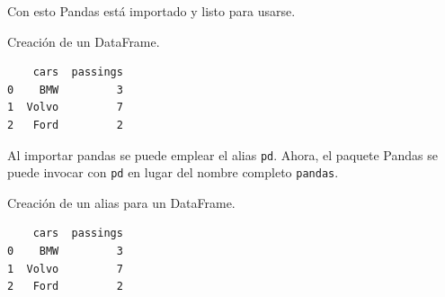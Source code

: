 Con esto Pandas está importado y listo para usarse. \\

\begin{code} Creación de un DataFrame.

\begin{Shaded}
\begin{Highlighting}[]

\OperatorTok{=}\NormalTok{ \{}
  \NormalTok{: [}\NormalTok{, }\NormalTok{, }\NormalTok{],}
  \NormalTok{: [}\NormalTok{, }\NormalTok{, }\NormalTok{]}
\NormalTok{\}}

\OperatorTok{=}

\end{Highlighting}
\end{Shaded}

\begin{verbatim}
    cars  passings
0    BMW         3
1  Volvo         7
2   Ford         2
\end{verbatim}
\end{code}

Al importar pandas se puede emplear el alias \texttt{pd}. Ahora, el
paquete Pandas se puede invocar con \texttt{pd} en lugar del nombre
completo \texttt{pandas}.\\

\begin{code} Creación de un alias para un DataFrame.
\begin{Shaded}
\begin{Highlighting}[]

\OperatorTok{=}\NormalTok{ \{}
  \NormalTok{: [}\NormalTok{, }\NormalTok{, }\NormalTok{],}
  \NormalTok{: [}\NormalTok{, }\NormalTok{, }\NormalTok{]}
\NormalTok{\}}

\OperatorTok{=}

\end{Highlighting}
\end{Shaded}

\begin{verbatim}
    cars  passings
0    BMW         3
1  Volvo         7
2   Ford         2
\end{verbatim}
\end{code}

